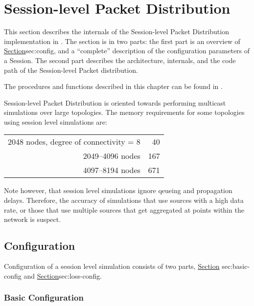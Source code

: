 \chapter{Session-level Packet Distribution}
\label{chap:session}

This section describes the internals of the Session-level Packet Distribution
implementation in \ns.
The section is in two parts:
the first part is an overview of 
\href{Session configuration}{Section}{sec:config},
and a ``complete'' description of the configuration parameters 
of a Session.
The second part describes the architecture, internals, and the code path
of the Session-level Packet distribution.

The procedures and functions described in this chapter can be found in
.

Session-level Packet Distribution is oriented towards
performing multicast simulations over large topologies.
The memory requirements for some topologies using
session level simulations are:

\begin{tabular}{r @{~~~$\approx$~} r@{\,MB}}
2048 nodes, degree of connectivity = 8 & 40 \\
2049--4096 nodes & 167 \\
4097--8194 nodes & 671 \\
\end{tabular}

Note however, that session level simulations ignore qeueing and
propagation delays.
Therefore, the accuracy of
simulations that use sources with a high data rate,
or those that use multiple sources that get aggregated at points
within the network is suspect.

\section{Configuration}
\label{sec:config}

Configuration of a session level simulation consists of two parts,
\href{configuration of the session level details themselves}{Section}{%
        sec:basic-config}
and 
\href{adding loss and error models to the session level abstraction
to model specific behaviours}{Section}{sec:loss-config}.

\subsection{Basic Configuration}
\label{sec:basic-config}

